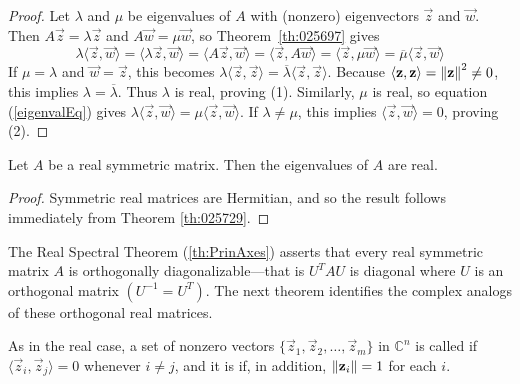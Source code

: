 \documentclass{ximera}
\begin{document}
\begin{proof}
Let $\lambda$ and $\mu$ be eigenvalues of $A$ with (nonzero) eigenvectors $\vec{z}$ and $\vec{w}$. Then $A\vec{z} = \lambda \vec{z}$ and $A\vec{w} = \mu \vec{w}$, so Theorem~\ref{th:025697} gives
\begin{equation} \label{eigenvalEq}
\lambda \langle \vec{z}, \vec{w} \rangle = \langle \lambda \vec{z}, \vec{w} \rangle = \langle A\vec{z}, \vec{w} \rangle = \langle \vec{z}, A\vec{w} \rangle = \langle \vec{z}, \mu \vec{w} \rangle = \overline{\mu} \langle \vec{z}, \vec{w} \rangle
\end{equation}
If $\mu = \lambda$ and $\vec{w} = \vec{z}$, this becomes $\lambda \langle \vec{z}, \vec{z} \rangle  = \overline{\lambda} \langle \vec{z}, \vec{z} \rangle$. Because $\langle \mathbf{z}, \mathbf{z} \rangle = \left\lVert\mathbf{z}\right\rVert^{2} \neq 0$, this implies $\lambda = \overline{\lambda}$. Thus $\lambda$ is real, proving (1). Similarly, $\mu$ is real, so equation (\ref{eigenvalEq}) gives $\lambda \langle \vec{z}, \vec{w} \rangle = \mu \langle \vec{z}, \vec{w} \rangle$. If $\lambda \neq \mu$, this implies $\langle \vec{z}, \vec{w} \rangle = 0$, proving (2).
\end{proof}

\begin{corollary}\label{cor:ews_symmetric_real}
    Let $A$ be a real symmetric matrix.  Then the eigenvalues of $A$ are real.
\end{corollary}

\begin{proof}
    Symmetric real matrices are Hermitian, and so the result follows immediately from Theorem \ref{th:025729}.
\end{proof}

The Real Spectral Theorem (\ref{th:PrinAxes}) asserts that every real symmetric matrix $A$ is orthogonally diagonalizable---that is $U^{T}AU$ is diagonal where $U$ is an orthogonal matrix $(U^{-1} = U^{T})$. The next theorem identifies the complex analogs of these orthogonal real matrices.

\begin{definition}\label{def:025749}
As in the real case, a set of nonzero vectors $\{\vec{z}_{1}, \vec{z}_{2}, \ldots, \vec{z}_{m}\}$ in $\mathbb{C}^n$ is called  if $\langle \vec{z}_{i}, \vec{z}_{j}\rangle = 0$ whenever $i \neq j$, and it is  if, in addition, $\left\lVert\mathbf{z}_{i} \right\rVert = 1$ for each $i$.
\end{definition}
\end{document}
